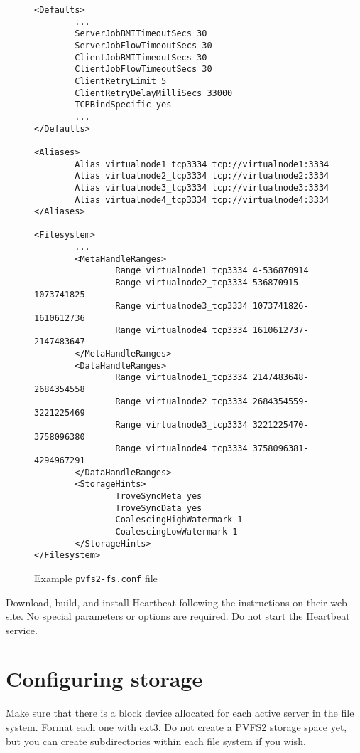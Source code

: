 \documentclass[11pt]{article}
\begin{document}
\begin{figure}
\begin{scriptsize}
\begin{verbatim}
<Defaults>
        ...
        ServerJobBMITimeoutSecs 30
        ServerJobFlowTimeoutSecs 30
        ClientJobBMITimeoutSecs 30
        ClientJobFlowTimeoutSecs 30
        ClientRetryLimit 5
        ClientRetryDelayMilliSecs 33000
        TCPBindSpecific yes
        ...
</Defaults>

<Aliases>
        Alias virtualnode1_tcp3334 tcp://virtualnode1:3334
        Alias virtualnode2_tcp3334 tcp://virtualnode2:3334
        Alias virtualnode3_tcp3334 tcp://virtualnode3:3334
        Alias virtualnode4_tcp3334 tcp://virtualnode4:3334
</Aliases>

<Filesystem>
        ...
        <MetaHandleRanges>
                Range virtualnode1_tcp3334 4-536870914
                Range virtualnode2_tcp3334 536870915-1073741825
                Range virtualnode3_tcp3334 1073741826-1610612736
                Range virtualnode4_tcp3334 1610612737-2147483647
        </MetaHandleRanges>
        <DataHandleRanges>
                Range virtualnode1_tcp3334 2147483648-2684354558
                Range virtualnode2_tcp3334 2684354559-3221225469
                Range virtualnode3_tcp3334 3221225470-3758096380
                Range virtualnode4_tcp3334 3758096381-4294967291
        </DataHandleRanges>
        <StorageHints>
                TroveSyncMeta yes
                TroveSyncData yes
                CoalescingHighWatermark 1
                CoalescingLowWatermark 1
        </StorageHints>
</Filesystem>
\end{verbatim}
\end{scriptsize}
\caption{Example \texttt{pvfs2-fs.conf} file}
\label{fig:pvfs2conf}
\end{figure}

Download, build, and install Heartbeat following the instructions on
their web site.  No special parameters or options are required.  Do not
start the Heartbeat service.

\section{Configuring storage}

Make sure that there is a block device allocated for each active server
in the file system.  Format each one with ext3.  Do not create a PVFS2
storage space yet, but you can create subdirectories within each file
system if you wish.
\end{document}
